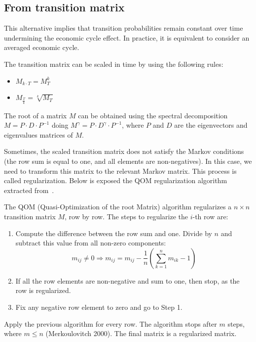 \documentclass[11pt,fleqn]{book} %
\begin{document}
\subsection{From transition matrix}
\label{pdftm}

This alternative implies that transition probabilities remain constant
over time undermining the economic cycle effect. In practice, it is 
equivalent to consider an averaged economic cycle.

\begin{proposition}
	The transition matrix can be scaled in time by using the following rules:
	\begin{itemize}
		\item $M_{k \cdot T} = M_{T}^k$
		\item $M_{\frac{T}{k}} = \sqrt[k]{M_{T}}$
	\end{itemize}
\end{proposition}

The root of a matrix $M$ can be obtained using the spectral decomposition
$M = P \cdot D \cdot P^{-1}$ doing 
$M^{\gamma} = P \cdot D^{\gamma} \cdot P^{-1}$, where $P$ and $D$ are the 
eigenvectors and eigenvalues matrices of $M$. 

Sometimes, the scaled transition matrix does not satisfy the Markov conditions
(the row sum is equal to one, and all elements are non-negatives). In this case, 
we need to transform this matrix to the relevant Markov matrix. This process is 
called regularization. Below is exposed the QOM regularization algorithm 
extracted from~\cite{kreinin:2001}.

\begin{algorithm}
	The QOM (Quasi-Optimization of the root Matrix) algorithm regularizes a 
	$n {\times} n$ transition matrix $M$, row by row. The steps to 
	regularize the $i$-th row are:
	\begin{enumerate}
		\item Compute the difference between the row sum and one. 
		Divide by $n$ and subtract this value from all non-zero components:
		\begin{displaymath}
			m_{ij} \ne 0 
			\Longrightarrow 
			m_{ij} = m_{ij} - \frac{1}{n} \left( \sum_{k=1}^{n} m_{ik} - 1\right)
		\end{displaymath}
		\item If all the row elements are non-negative and sum to one, 
		then stop, as the row is regularized.
		\item Fix any negative row element to zero and go to Step 1.
	\end{enumerate}
	
	Apply the previous algorithm for every row. The algorithm stops after $m$ 
	steps, where $m \le n$ (Merkoulovitch 2000). The final matrix is a regularized
	matrix. 
\end{algorithm}
\end{document}
